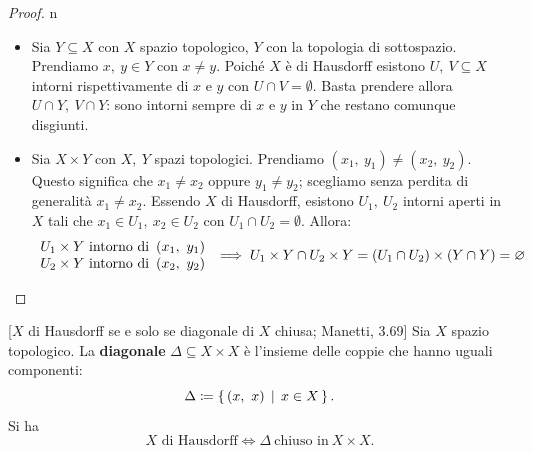 \begin{proof}{n}~{}
\begin{itemize}
\item Sia $Y\subseteq X$ con $X$ spazio topologico, $Y$ con la topologia di sottospazio. Prendiamo $x,\ y\in Y$ con $x\neq y$. Poiché $X$ è di Hausdorff esistono $ U,\ V\subseteq X$ intorni rispettivamente di $x$ e $y$ con $U\cap V=\emptyset$. Basta prendere allora $U\cap Y,\ V\cap Y$: sono intorni sempre di $x$ e $y$ in $Y$ che restano comunque disgiunti.
\item Sia $X\times Y$ con $X,\ Y$ spazi topologici. Prendiamo $\left(x_1,\ y_1\right)\neq\left(x_2,\ y_2\right)$. Questo significa che $x_1\neq x_2$ oppure $y_1\neq y_2$; scegliamo senza perdita di generalità $x_1\neq x_2$. Essendo $X$ di Hausdorff, esistono $U_1,\ U_2$ intorni aperti in $X$ tali che $x_1\in U_1,\ x_2\in U_2$ con $U_1\cap U_2=\emptyset$. Allora:
\begin{equation*}
\begin{array}{l}
	U_1\times Y\text{ intorno di }\left(x_1,\ y_1\right)\\
	U_2\times Y\text{ intorno di }\left(x_2,\ y_2\right)
\end{array}
\implies U_1\times Y\cap U_2\times Y=\left(U_1\cap U_2\right)\times\left(Y\cap Y\right)=\emptyset\qedhere
\end{equation*}
\end{itemize}
\end{proof}
\begin{theorem}{}[$X$ di Hausdorff se e solo se diagonale di $X$ chiusa; Manetti, 3.69]\label{hausdorff diagonale chiusa}
Sia $X$ spazio topologico. La \textbf{diagonale} $\Delta\subseteq X\times X$ è l'insieme delle coppie che hanno uguali componenti:
\begin{equation*}
	\Delta\coloneqq\Set{\left(x,\ x\right) | x\in X}.
\end{equation*}
Si ha
\begin{equation*}
X \text{ di Hausdorff} \iff \Delta\ \text{chiuso in}\ X\times X.
\end{equation*}
\end{theorem}
